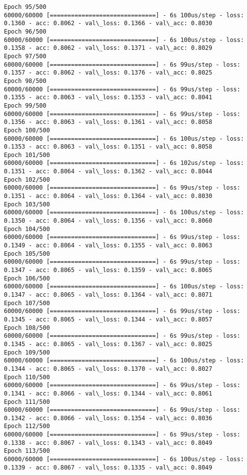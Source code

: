 \documentclass[11pt]{article}
\begin{document}
\begin{Verbatim}[commandchars=\\\{\}]
Epoch 95/500
60000/60000 [==============================] - 6s 100us/step - loss: 0.1360 - acc: 0.8062 - val\_loss: 0.1366 - val\_acc: 0.8030
Epoch 96/500
60000/60000 [==============================] - 6s 100us/step - loss: 0.1358 - acc: 0.8062 - val\_loss: 0.1371 - val\_acc: 0.8029
Epoch 97/500
60000/60000 [==============================] - 6s 99us/step - loss: 0.1357 - acc: 0.8062 - val\_loss: 0.1376 - val\_acc: 0.8025
Epoch 98/500
60000/60000 [==============================] - 6s 99us/step - loss: 0.1355 - acc: 0.8063 - val\_loss: 0.1353 - val\_acc: 0.8041
Epoch 99/500
60000/60000 [==============================] - 6s 99us/step - loss: 0.1356 - acc: 0.8063 - val\_loss: 0.1361 - val\_acc: 0.8058
Epoch 100/500
60000/60000 [==============================] - 6s 100us/step - loss: 0.1353 - acc: 0.8063 - val\_loss: 0.1351 - val\_acc: 0.8058
Epoch 101/500
60000/60000 [==============================] - 6s 102us/step - loss: 0.1351 - acc: 0.8064 - val\_loss: 0.1362 - val\_acc: 0.8044
Epoch 102/500
60000/60000 [==============================] - 6s 99us/step - loss: 0.1351 - acc: 0.8064 - val\_loss: 0.1364 - val\_acc: 0.8030
Epoch 103/500
60000/60000 [==============================] - 6s 100us/step - loss: 0.1350 - acc: 0.8064 - val\_loss: 0.1356 - val\_acc: 0.8060
Epoch 104/500
60000/60000 [==============================] - 6s 99us/step - loss: 0.1349 - acc: 0.8064 - val\_loss: 0.1355 - val\_acc: 0.8063
Epoch 105/500
60000/60000 [==============================] - 6s 99us/step - loss: 0.1347 - acc: 0.8065 - val\_loss: 0.1359 - val\_acc: 0.8065
Epoch 106/500
60000/60000 [==============================] - 6s 100us/step - loss: 0.1347 - acc: 0.8065 - val\_loss: 0.1364 - val\_acc: 0.8071
Epoch 107/500
60000/60000 [==============================] - 6s 99us/step - loss: 0.1345 - acc: 0.8065 - val\_loss: 0.1344 - val\_acc: 0.8057
Epoch 108/500
60000/60000 [==============================] - 6s 99us/step - loss: 0.1345 - acc: 0.8065 - val\_loss: 0.1367 - val\_acc: 0.8025
Epoch 109/500
60000/60000 [==============================] - 6s 100us/step - loss: 0.1344 - acc: 0.8065 - val\_loss: 0.1370 - val\_acc: 0.8027
Epoch 110/500
60000/60000 [==============================] - 6s 99us/step - loss: 0.1341 - acc: 0.8066 - val\_loss: 0.1344 - val\_acc: 0.8061
Epoch 111/500
60000/60000 [==============================] - 6s 99us/step - loss: 0.1342 - acc: 0.8066 - val\_loss: 0.1354 - val\_acc: 0.8036
Epoch 112/500
60000/60000 [==============================] - 6s 99us/step - loss: 0.1338 - acc: 0.8067 - val\_loss: 0.1343 - val\_acc: 0.8049
Epoch 113/500
60000/60000 [==============================] - 6s 100us/step - loss: 0.1339 - acc: 0.8067 - val\_loss: 0.1335 - val\_acc: 0.8049

\end{Verbatim}
\end{document}
